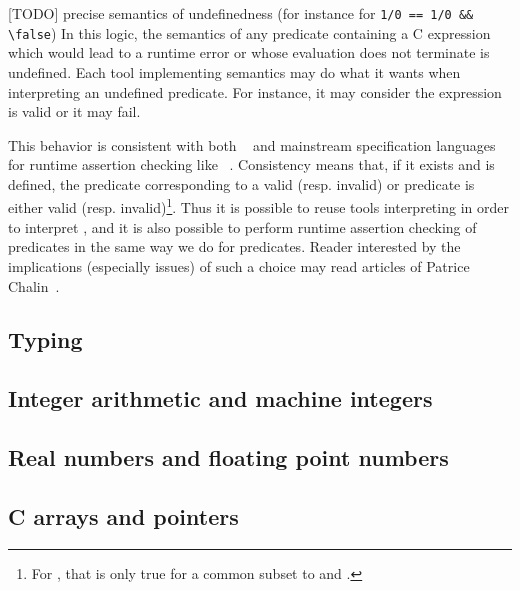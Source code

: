 [TODO] precise semantics of undefinedness (for instance for
\lstinline|1/0 == 1/0 && \false|)
In this logic, the semantics of any
predicate containing a C expression which would lead to a runtime
error or whose evaluation does not terminate is undefined. Each tool
implementing \eacsl semantics may do what it wants when interpreting
an undefined predicate. For instance, it may consider the expression
is valid or it may fail.

This behavior is consistent with both \acsl~\cite{acsl} and mainstream
specification languages for runtime assertion checking like
\jml~\cite{jml}. Consistency means that, if it exists and is defined, the \eacsl
predicate corresponding to a valid (resp. invalid) \acsl or \jml predicate is
either valid (resp. invalid)\footnote{For \jml, that is only true for a common
  subset to \eacsl and \jml.}. Thus it is possible to reuse tools interpreting
\acsl in order to interpret \eacsl, and it is also possible to perform runtime
assertion checking of \eacsl predicates in the same way we do for \jml
predicates. Reader interested by the implications (especially issues) of such a
choice may read articles of Patrice Chalin~\cite{chalin05,chalin07}.


\subsection{Typing}
\nodiff


\subsection{Integer arithmetic and machine integers}
\nodiff


\subsection{Real numbers and floating point numbers}
\nodiff


\subsection{C arrays and pointers}
\nodiff

